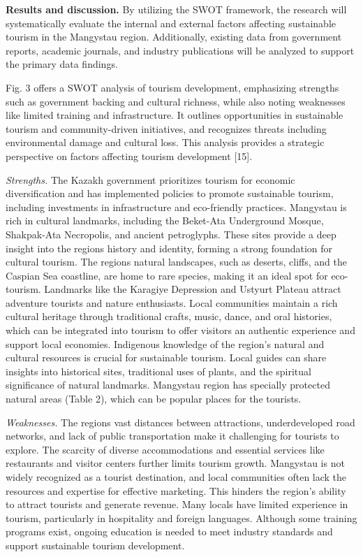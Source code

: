 \begin{multicols}{2}
{\bfseries Results and discussion.} By utilizing the SWOT framework, the
research will systematically evaluate the internal and external factors
affecting sustainable tourism in the Mangystau region. Additionally,
existing data from government reports, academic journals, and industry
publications will be analyzed to support the primary data findings.

Fig. 3 offers a SWOT analysis of tourism development, emphasizing
strengths such as government backing and cultural richness, while also
noting weaknesses like limited training and infrastructure. It outlines
opportunities in sustainable tourism and community-driven initiatives,
and recognizes threats including environmental damage and cultural loss.
This analysis provides a strategic perspective on factors affecting
tourism development {[}15{]}.

\emph{Strengths.} The Kazakh government prioritizes tourism for economic
diversification and has implemented policies to promote sustainable
tourism, including investments in infrastructure and eco-friendly
practices. Mangystau is rich in cultural landmarks, including the
Beket-Ata Underground Mosque, Shakpak-Ata Necropolis, and ancient
petroglyphs. These sites provide a deep insight into the
region\textquotesingle s history and identity, forming a strong
foundation for cultural tourism. The region\textquotesingle s natural
landscapes, such as deserts, cliffs, and the Caspian Sea coastline, are
home to rare species, making it an ideal spot for eco-tourism. Landmarks
like the Karagiye Depression and Ustyurt Plateau attract adventure
tourists and nature enthusiasts. Local communities maintain a rich
cultural heritage through traditional crafts, music, dance, and oral
histories, which can be integrated into tourism to offer visitors an
authentic experience and support local economies. Indigenous knowledge
of the region's natural and cultural resources is crucial for
sustainable tourism. Local guides can share insights into historical
sites, traditional uses of plants, and the spiritual significance of
natural landmarks. Mangystau region has specially protected natural
areas (Table 2), which can be popular places for the tourists.

\emph{Weaknesses.} The region\textquotesingle s vast distances between
attractions, underdeveloped road networks, and lack of public
transportation make it challenging for tourists to explore. The scarcity
of diverse accommodations and essential services like restaurants and
visitor centers further limits tourism growth. Mangystau is not widely
recognized as a tourist destination, and local communities often lack
the resources and expertise for effective marketing. This hinders the
region's ability to attract tourists and generate revenue. Many locals
have limited experience in tourism, particularly in hospitality and
foreign languages. Although some training programs exist, ongoing
education is needed to meet industry standards and support sustainable
tourism development.


\end{multicols}
